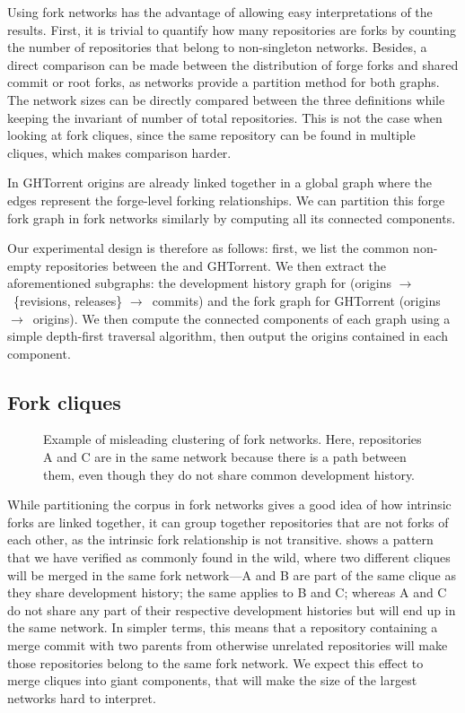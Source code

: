 Using fork networks has the advantage of allowing easy interpretations of the
results. First, it is trivial to quantify how many repositories are forks by
counting the number of repositories that belong to non-singleton networks.
Besides, a direct comparison can be made between the distribution of forge
forks and shared commit or root forks, as networks provide a partition method
for both graphs. The network sizes can be directly compared between the three
definitions while keeping the invariant of number of total repositories.
This is not the case when looking at fork cliques, since the same repository
can be found in multiple cliques, which makes comparison harder.

In GHTorrent origins are already linked together in a global graph where the
edges represent the forge-level forking relationships. We can partition this
forge fork graph in fork networks similarly by computing all its connected
components.

Our experimental design is therefore as follows: first, we list the common
non-empty repositories between the \SWHGD{} and GHTorrent. We then extract the
aforementioned subgraphs: the development history graph for \SWH{} (origins
$\to$~\{revisions, releases\} $\to$~commits) and the fork graph for GHTorrent
(origins $\to$~origins). We then compute the connected components of each graph
using a simple depth-first traversal algorithm, then output the origins
contained in each component.

\subsection{Fork cliques}%
\label{sec:methodology-fork-cliques}

\begin{figure}[t]
  \centering
  
  \caption{Example of misleading clustering of fork networks.  Here,
    repositories A and C are in the same network because there is a path
    between them, even though they do not share common development history.}%
  \label{fig:fork-transitive-fail}
\end{figure}

While partitioning the corpus in fork networks gives a good idea of how
intrinsic forks are linked together, it can group together repositories that
are not forks of each other, as the intrinsic fork relationship is not
transitive.  shows a pattern that we
have verified as commonly found in the wild, where two different cliques will
be merged in the same fork network---A and B are part of the same clique as
they share development history; the same applies to B and C\@; whereas A and C
do not share any part of their respective development histories but will end up
in the same network. In simpler terms, this means that a repository containing
a merge commit with two parents from otherwise unrelated repositories will make
those repositories belong to the same fork network.  We expect this effect to
merge cliques into giant components, that will make the size of the largest
networks hard to interpret.


